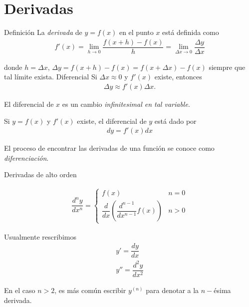 \section{Derivadas}

{Definición}
  La \emph{derivada} de $y=f(x)$ en el punto $x$ está definida como
  \begin{align*}
   f'(x)= \lim_{h\to 0}\dfrac{f(x+h)-f(x)}{h} 
   = \lim_{\Delta x \to 0}\dfrac{\Delta y}{\Delta x}
   \end{align*}

donde $h=\Delta x$, $\Delta y=f(x+h)-f(x)=f(x+\Delta x)-f(x)$ siempre que tal límite exista.
{Diferencial}
  Si $\Delta x \approx 0$ y $f'(x)$ existe, entonces 
  \begin{align*}
   \Delta y \approx f'(x) \Delta x.
   \end{align*}

{}
   El diferencial de $x$ es un cambio \emph{infinitesimal  en tal variable}. 

{}
  \begin{definicion}
   Si $y = f(x)$ y $f'(x)$ existe, el diferencial de $y$ está dado por
   \begin{align*}
    dy = f'(x)dx
    \end{align*}
  \end{definicion}


{}
  El proceso de encontrar las derivadas de una función se conoce como \emph{diferenciación}.

{Derivadas de alto orden}
  \begin{definicion}
   \begin{align*}
    \dfrac{d^{n}y}{dx^{n}}= 
    \begin{cases}
f(x) & n=0 \\
\dfrac{d}{dx}\left( \dfrac{d^{n-1}}{dx^{n-1}}f(x) \right) & n>0
\end{cases}
    \end{align*}
  \end{definicion}


{}
  Usualmente rescribimos 
  \begin{align*}
   y' = \dfrac{dy}{dx} \\
   y'' = \dfrac{d^{2}y}{dx^{2}}    
   \end{align*}
   
   En el caso $n>2$, es más común escribir
 $   y^{(n)}$ para denotar a la $n-$ésima derivada. 

